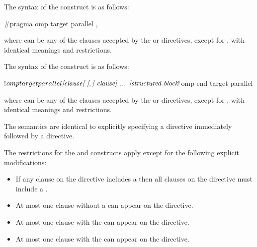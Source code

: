 \syntax
\begin{ccppspecific}
The syntax of the   construct is as follows:

\begin{ompcPragma}
#pragma omp target parallel \plc{[clause[ [},\plc{] clause] ... ] new-line}
\end{ompcPragma}

where  can be any of the clauses accepted by the  or
 directives, except for , with identical meanings 
and restrictions.
\end{ccppspecific}

\begin{samepage}
\begin{fortranspecific}
The syntax of the   construct is as follows:

\begin{ompfPragma}
!$omp target parallel \plc{[clause[ [},\plc{] clause] ... ]}
    \plc{structured-block}
!$omp end target parallel
\end{ompfPragma}

where  can be any of the clauses accepted by the  or
 directives, except for , with identical meanings 
and restrictions.
\end{fortranspecific}
\end{samepage}

\descr
The semantics are identical to explicitly specifying a  directive
immediately followed by a  directive.

\restrictions

The restrictions for the  and  constructs apply 
except for the following explicit modifications:

\begin{itemize}
\item If any  clause on the directive includes a
       then all  clauses
      on the directive must include a .
\item At most one  clause without a
       can appear on the directive.
\item At most one  clause with the 
       can appear on the directive.
\item At most one  clause with the 
       can appear on the directive.
\end{itemize}

